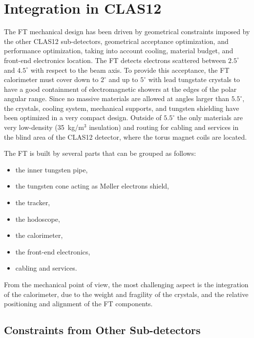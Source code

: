\section{Integration in CLAS12}
\label{sec:integration}

The FT mechanical design  has been driven by geometrical constraints imposed by the other CLAS12 sub-detectors,
geometrical acceptance optimization, and performance optimization, taking into account cooling, material budget, and
front-end electronics location. The FT detects electrons scattered between $2.5^\circ$ and $4.5^\circ$ with respect
to the beam axis. To provide this acceptance, the FT calorimeter must cover down to $2^\circ$ and up to $5^\circ$ with
lead tungstate crystals to have a good containment of electromagnetic showers at the edges of the polar angular range.
Since no massive materials are allowed at angles larger than $5.5^\circ$, the crystals, cooling system, mechanical
supports, and tungsten shielding have been optimized in a very compact design. Outside of $5.5^\circ$ the only
materials are very low-density (35~kg/m$^3$ insulation) and routing for cabling and services in the blind area of the
CLAS12 detector, where the torus magnet coils are located.

The FT is built by several parts that can be grouped as follows:

\begin{itemize}
\item{the inner tungsten pipe,}
\item{the tungsten cone acting as M{\o}ller electrons shield,}
\item{the tracker,}
\item{the hodoscope,}
\item{the calorimeter,}
\item{the front-end electronics,}
\item{cabling and services.}
\end{itemize}

From the mechanical point of view, the most challenging aspect is the integration of the calorimeter, due to the
weight and fragility of the crystals, and the relative positioning and alignment of the FT components.

\subsection{Constraints from Other Sub-detectors}

